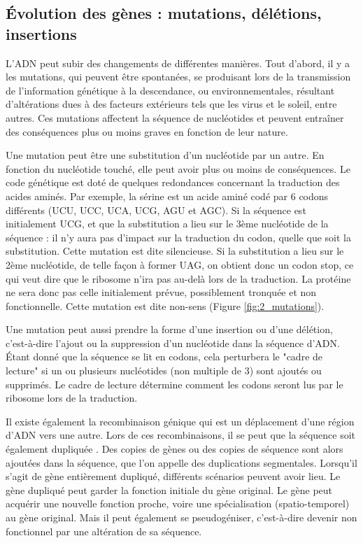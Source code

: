 \subsection{Évolution des gènes : mutations, délétions, insertions}\label{mutations}
\par L'ADN peut subir des changements de différentes manières. Tout d'abord, il y a les mutations, qui peuvent être spontanées, se produisant lors de la transmission de l'information génétique à la descendance, ou environnementales, résultant d'altérations dues à des facteurs extérieurs tels que les virus et le soleil, entre autres. Ces mutations affectent la séquence de nucléotides et peuvent entraîner des conséquences plus ou moins graves en fonction de leur nature.
\par Une mutation peut être une substitution d’un nucléotide par un autre. En fonction du nucléotide touché, elle peut avoir plus ou moins de conséquences. Le code génétique est doté de quelques redondances concernant la traduction des acides aminés. Par exemple, la sérine est un acide aminé codé par 6 codons différents (UCU, UCC, UCA, UCG, AGU et AGC). Si la séquence est initialement UCG, et que la substitution a lieu sur le 3ème nucléotide de la séquence : il n’y aura pas d’impact sur la traduction du codon, quelle que soit la substitution. Cette mutation est dite silencieuse. Si la substitution a lieu sur le 2ème nucléotide, de telle façon à former UAG, on obtient donc un codon stop, ce qui veut dire que le ribosome n'ira pas au-delà lors de la traduction. La protéine ne sera donc pas celle initialement prévue, possiblement tronquée et non fonctionnelle. Cette mutation est dite non-sens (Figure \ref{fig:2_mutations}). 
\par Une mutation peut aussi prendre la forme d'une insertion ou d'une délétion, c'est-à-dire l'ajout ou la suppression d'un nucléotide dans la séquence d'ADN. Étant donné que la séquence se lit en codons, cela perturbera le "cadre de lecture" si un ou plusieurs nucléotides (non multiple de 3) sont ajoutés ou supprimés. Le cadre de lecture détermine comment les codons seront lus par le ribosome lors de la traduction. 
\par Il existe également la recombinaison génique qui est un déplacement d’une région d’ADN vers une autre. Lors de ces recombinaisons, il se peut que la séquence soit également dupliquée \parencite{sasaki_genome_2010, stewart_homologous_2022, syeda_recombination_2014}. Des copies de gènes ou des copies de séquence sont alors ajoutées dans la séquence, que l’on appelle des duplications segmentales. Lorsqu’il s’agit de gène entièrement dupliqué, différents scénarios peuvent avoir lieu. Le gène dupliqué peut garder la fonction initiale du gène original. Le gène peut acquérir une nouvelle fonction proche, voire une spécialisation (spatio-temporel) au gène original. Mais il peut également se pseudogéniser, c’est-à-dire devenir non fonctionnel par une altération de sa séquence. 
